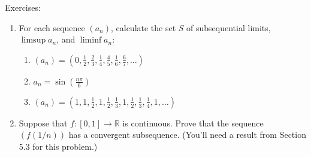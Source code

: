 \documentclass[letterpaper,12pt]{article}
\newcommand{\R}{\mathbb{R}}
\begin{document}
\noindent Exercises:
\begin{enumerate}
 \item For each sequence $(a_n)$, calculate the set $S$ of subsequential limits, $\limsup a_n$, and $\liminf a_n$:
\begin{enumerate}
 \item $\displaystyle (a_n) = \left(0,\frac{1}{2},\frac{2}{3},\frac{1}{4},\frac{4}{5},\frac{1}{6},\frac{6}{7},\ldots\right)$
 \item $\displaystyle a_n = \sin\left(\frac{n\pi}{6}\right)$
 \item $\displaystyle (a_n) = \left(1,1,\frac{1}{2},1,\frac{1}{2},\frac{1}{3},1,\frac{1}{2},\frac{1}{3},\frac{1}{4},1,\ldots\right)$
\end{enumerate}
 \item Suppose that $f:[0,1]\to\R$ is continuous. Prove that the sequence $\left(f(1/n)\right)$ has a convergent subsequence. (You'll need a result from Section 5.3 for this problem.)
\end{enumerate}
\end{document}
